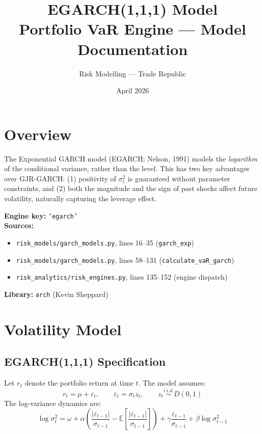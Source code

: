 \documentclass[11pt, a4paper]{article}
\title{\textbf{EGARCH(1,1,1) Model}\\[4pt]
\large Portfolio VaR Engine --- Model Documentation}
\author{Risk Modelling --- Trade Republic}
\date{April 2026}
\begin{document}
\maketitle

\section{Overview}

The Exponential GARCH model (EGARCH; Nelson, 1991) models the
\textit{logarithm} of the conditional variance, rather than the level.
This has two key advantages over GJR-GARCH: (1) positivity of $\sigma_t^2$
is guaranteed without parameter constraints, and (2) both the magnitude
and the sign of past shocks affect future volatility, naturally capturing
the leverage effect.

\textbf{Engine key:} \texttt{'egarch'} \\
\textbf{Sources:}
\begin{itemize}
  \item \texttt{risk\_models/garch\_models.py}, lines 16--35 (\texttt{garch\_exp})
  \item \texttt{risk\_models/garch\_models.py}, lines 58--131 (\texttt{calculate\_vaR\_garch})
  \item \texttt{risk\_analytics/risk\_engines.py}, lines 135--152 (engine dispatch)
\end{itemize}
\textbf{Library:} \texttt{arch} (Kevin Sheppard)

\section{Volatility Model}

\subsection{EGARCH(1,1,1) Specification}

Let $r_t$ denote the portfolio return at time $t$. The model assumes:
\begin{equation}
r_t = \mu + \varepsilon_t, \qquad
\varepsilon_t = \sigma_t z_t, \qquad
z_t \overset{i.i.d.}{\sim} D(0,1)
\end{equation}
The log-variance dynamics are:
\begin{equation}
\log \sigma_t^2
= \omega
+ \alpha \left(\frac{|\varepsilon_{t-1}|}{\sigma_{t-1}}
              - \mathbb{E}\!\left[\frac{|\varepsilon_{t-1}|}{\sigma_{t-1}}\right]\right)
+ \gamma \frac{\varepsilon_{t-1}}{\sigma_{t-1}}
+ \beta \log \sigma_{t-1}^2
\label{eq:egarch}
\end{equation}
\end{document}
